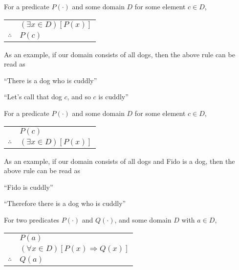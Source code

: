\documentclass[main.tex]{subfiles}
\begin{document}
\begin{thm}
	For a predicate \(P(\cdot)\) and some domain \(D\) for some element \(c \in D\),
	\begin{center}
		\begin{tabular}{c@{\,}l@{}}
			& \((\exists x \in D)[P(x)]\) \\
			\cline{2-2}
			\(\therefore\) & \(P(c)\)
		\end{tabular}
	\end{center}

	As an example, if our domain consists of all dogs, then the above rule can be read as
	\begin{center}
		``There is a dog who is cuddly''
		
		``Let's call that dog \(c\), and so \(c\) is cuddly''
	\end{center}
\end{thm}

\begin{thm}
	For a predicate \(P(\cdot)\) and some domain \(D\) for some element \(c \in D\),
	\begin{center}
		\begin{tabular}{c@{\,}l@{}}
			& \(P(c)\) \\
			\cline{2-2}
			\(\therefore\) & \((\exists x \in D)[P(x)]\)
		\end{tabular}
	\end{center}

	As an example, if our domain consists of all dogs and Fido is a dog, then the above rule can be read as
	\begin{center}
		``Fido is cuddly''
		
		``Therefore there is a dog who is cuddly''
	\end{center}
\end{thm}

\begin{thm}
	For two predicates \(P(\cdot)\) and \(Q(\cdot)\), and some domain \(D\) with \(a \in D\),
	\begin{center}
		\begin{tabular}{c@{\,}l@{}}
			& \(P(a)\) \\
			& \((\forall x \in D)[P(x) \Rightarrow Q(x)]\) \\
			\cline{2-2}
			\(\therefore\) & \(Q(a)\)
		\end{tabular}
	\end{center}
\end{thm}
\end{document}
